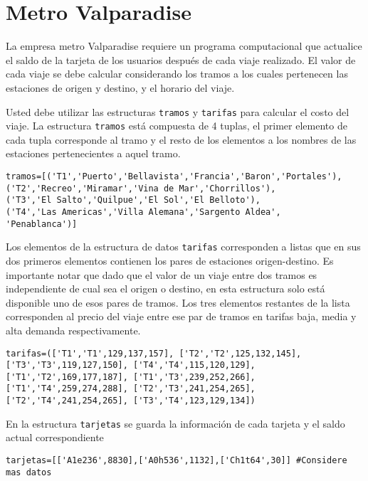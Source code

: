 \section{Metro Valparadise}

La empresa metro Valparadise requiere un programa computacional que actualice el saldo de la tarjeta de los usuarios después de cada viaje realizado. El valor de cada viaje se debe calcular considerando los tramos a los cuales pertenecen las estaciones de origen y destino, y el horario del viaje.

Usted debe utilizar las estructuras \texttt{tramos} y \texttt{tarifas} para calcular el costo del viaje. La estructura \texttt{tramos} está compuesta de 4 tuplas, el primer elemento de cada tupla corresponde al tramo y el resto de los elementos a los nombres de las estaciones pertenecientes a aquel tramo.

\begin{lstlisting}[style=consola]
tramos=[('T1','Puerto','Bellavista','Francia','Baron','Portales'),
('T2','Recreo','Miramar','Vina de Mar','Chorrillos'),
('T3','El Salto','Quilpue','El Sol','El Belloto'),
('T4','Las Americas','Villa Alemana','Sargento Aldea',
'Penablanca')]
\end{lstlisting}
Los elementos de la estructura de datos \texttt{tarifas} corresponden a listas que en sus dos primeros elementos contienen los pares de estaciones origen-destino. Es importante notar que dado que el valor de un viaje entre dos tramos es independiente de cual sea el origen o destino, en esta estructura solo está disponible uno de esos pares de tramos. Los tres elementos restantes de la lista corresponden al precio del viaje entre ese par de tramos en tarifas baja, media y alta demanda respectivamente.

\begin{lstlisting}[style=consola]
tarifas=(['T1','T1',129,137,157], ['T2','T2',125,132,145],
['T3','T3',119,127,150], ['T4','T4',115,120,129],
['T1','T2',169,177,187], ['T1','T3',239,252,266],
['T1','T4',259,274,288], ['T2','T3',241,254,265],
['T2','T4',241,254,265], ['T3','T4',123,129,134])
\end{lstlisting}

En la estructura \texttt{tarjetas} se guarda la información de cada tarjeta y el saldo actual correspondiente

\begin{lstlisting}[style=consola]
tarjetas=[['A1e236',8830],['A0h536',1132],['Ch1t64',30]] #Considere mas datos
\end{lstlisting}

